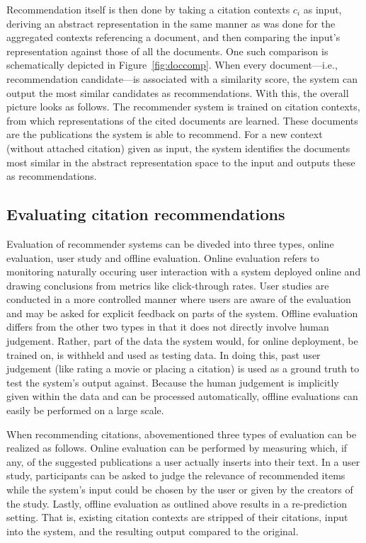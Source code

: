 Recommendation itself is then done by taking a citation contexts $c_i$ as input, deriving an abstract representation in the same manner as was done for the aggregated contexts referencing a document, and then comparing the input's representation against those of all the documents. One such comparison is schematically depicted in Figure~\ref{fig:doccomp}. When every document---i.e., recommendation candidate---is associated with a similarity score, the system can output the most similar candidates as recommendations. With this, the overall picture looks as follows. The recommender system is trained on citation contexts, from which representations of the cited documents are learned. These documents are the publications the system is able to recommend. For a new context (without attached citation) given as input, the system identifies the documents most similar in the abstract representation space to the input and outputs these as recommendations.

\subsection{Evaluating citation recommendations}
Evaluation of recommender systems can be diveded into three types, online evaluation, user study and offline evaluation. Online evaluation refers to monitoring naturally occuring user interaction with a system deployed online and drawing conclusions from metrics like click-through rates. User studies are conducted in a more controlled manner where users are aware of the evaluation and may be asked for explicit feedback on parts of the system. Offline evaluation differs from the other two types in that it does not directly involve human judgement. Rather, part of the data the system would, for online deployment, be trained on, is withheld and used as testing data. In doing this, past user judgement (like rating a movie or placing a citation) is used as a ground truth to test the system's output against. Because the human judgement is implicitly given within the data and can be processed automatically, offline evaluations can easily be performed on a large scale.~\cite{Aggarwal2016}

When recommending citations, abovementioned three types of evaluation can be realized as follows. Online evaluation can be performed by measuring which, if any, of the suggested publications a user actually inserts into their text. In a user study, participants can be asked to judge the relevance of recommended items while the system's input could be chosen by the user or given by the creators of the study. Lastly, offline evaluation as outlined above results in a re-prediction setting. That is, existing citation contexts are stripped of their citations, input into the system, and the resulting output compared to the original.

